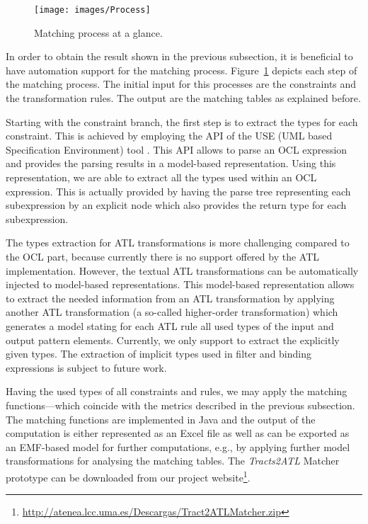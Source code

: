 
\begin{figure}[h!]
\centering
\texttt{[image: images/Process]}
\caption{Matching process at a glance.}
\label{fig:Process}
\end{figure}

In order to obtain the result shown in the previous subsection, it is beneficial to have automation support for the matching process. Figure~\ref{fig:Process} depicts each step of the matching process. The initial input for this processes are the constraints and the transformation rules. The output are the matching tables as explained before.

Starting with the constraint branch, the first step is to extract the types for each constraint. This is achieved by employing the API of the USE (UML based Specification Environment) tool \cite{USE2}. This API allows to parse an OCL expression and provides the parsing results in a model-based representation. Using this representation, we are able to extract all the types used within an OCL expression. This is actually provided by having the parse tree representing each subexpression by an explicit node which also provides the return type for each subexpression.

The types extraction for ATL transformations is more challenging compared to the OCL part, because currently there is no support offered by the ATL implementation. However, the textual ATL transformations can be automatically injected to model-based representations. This model-based representation allows to extract the needed information from an ATL transformation by applying another ATL transformation (a so-called higher-order transformation) which generates a model stating for each ATL rule all used types of the input and output pattern elements. Currently, we only support to extract the explicitly given types. The extraction of implicit types used in filter and binding expressions is subject to future work. %

Having the used types of all constraints and rules, we may apply the matching functions---which coincide with the metrics described in the previous subsection. The matching functions are implemented in Java and the output of the computation is either represented as an Excel file as well as can be exported as an EMF-based model for further computations, e.g., by applying further model transformations for analysing the matching tables. The \emph{Tracts2ATL} Matcher prototype can be downloaded from our project website\footnote{\url{http://atenea.lcc.uma.es/Descargas/Tract2ATLMatcher.zip}}. 